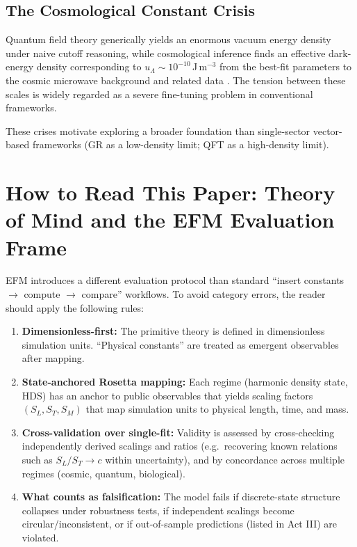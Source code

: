 \documentclass[11pt, twoside]{article}
\begin{document}
\subsection{The Cosmological Constant Crisis}
Quantum field theory generically yields an enormous vacuum energy density under naive cutoff reasoning, while cosmological inference finds an effective dark-energy density corresponding to $u_\Lambda \sim 10^{-10}$\,J\,m$^{-3}$ from the best-fit parameters to the cosmic microwave background and related data \citep{weinberg1989,planck2020}. The tension between these scales is widely regarded as a severe fine-tuning problem in conventional frameworks.

These crises motivate exploring a broader foundation than single-sector vector-based frameworks (GR as a low-density limit; QFT as a high-density limit).

\section{How to Read This Paper: Theory of Mind and the EFM Evaluation Frame}
EFM introduces a different evaluation protocol than standard ``insert constants $\rightarrow$ compute $\rightarrow$ compare'' workflows. To avoid category errors, the reader should apply the following rules:

\begin{enumerate}[leftmargin=*]
\item \textbf{Dimensionless-first:} The primitive theory is defined in dimensionless simulation units. ``Physical constants'' are treated as emergent observables after mapping.
\item \textbf{State-anchored Rosetta mapping:} Each regime (harmonic density state, HDS) has an anchor to public observables that yields scaling factors $(S_L, S_T, S_M)$ that map simulation units to physical length, time, and mass.
\item \textbf{Cross-validation over single-fit:} Validity is assessed by cross-checking independently derived scalings and ratios (e.g.\ recovering known relations such as $S_L/S_T \rightarrow c$ within uncertainty), and by concordance across multiple regimes (cosmic, quantum, biological).
\item \textbf{What counts as falsification:} The model fails if discrete-state structure collapses under robustness tests, if independent scalings become circular/inconsistent, or if out-of-sample predictions (listed in Act III) are violated.
\end{enumerate}
\end{document}
